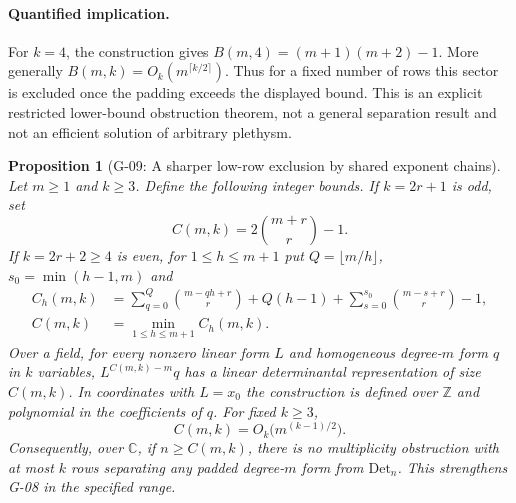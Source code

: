 \documentclass[11pt,a4paper]{article}
\newtheorem{proposition}{Proposition}
\theoremstyle{definition}\newtheorem{definition}{Definition}
\begin{document}
\paragraph{Quantified implication.}
For $k=4$, the construction gives $B(m,4)=(m+1)(m+2)-1$. More generally $B(m,k)=O_k(m^{\lceil k/2\rceil})$. Thus for a fixed number of rows this sector is excluded once the padding exceeds the displayed bound. This is an explicit restricted lower-bound obstruction theorem, not a general separation result and not an efficient solution of arbitrary plethysm.

\begin{proposition}[G-09: A sharper low-row exclusion by shared exponent chains]\label{G-09}
Let $m\geq1$ and $k\geq3$. Define the following integer bounds. If $k=2r+1$ is odd, set
\[
 C(m,k)=2\binom{m+r}{r}-1.
\]
If $k=2r+2\geq4$ is even, for $1\leq h\leq m+1$ put $Q=\lfloor m/h\rfloor$, $s_0=\min(h-1,m)$ and
\[
\begin{aligned}
 C_h(m,k)&=\sum_{q=0}^{Q}\binom{m-qh+r}{r}+Q(h-1)
          +\sum_{s=0}^{s_0}\binom{m-s+r}{r}-1,\\
 C(m,k)&=\min_{1\leq h\leq m+1}C_h(m,k).
\end{aligned}
\]
Over a field, for every nonzero linear form $L$ and homogeneous degree-$m$ form $q$ in $k$ variables, $L^{C(m,k)-m}q$ has a linear determinantal representation of size $C(m,k)$. In coordinates with $L=x_0$ the construction is defined over $\mathbb Z$ and polynomial in the coefficients of $q$. For fixed $k\geq3$,
\[
 C(m,k)=O_k\bigl(m^{(k-1)/2}\bigr).
\]
Consequently, over $\mathbb C$, if $n\geq C(m,k)$, there is no multiplicity obstruction with at most $k$ rows separating any padded degree-$m$ form from $\mathrm{Det}_n$. This strengthens G-08 in the specified range.
\end{proposition}
\end{document}
